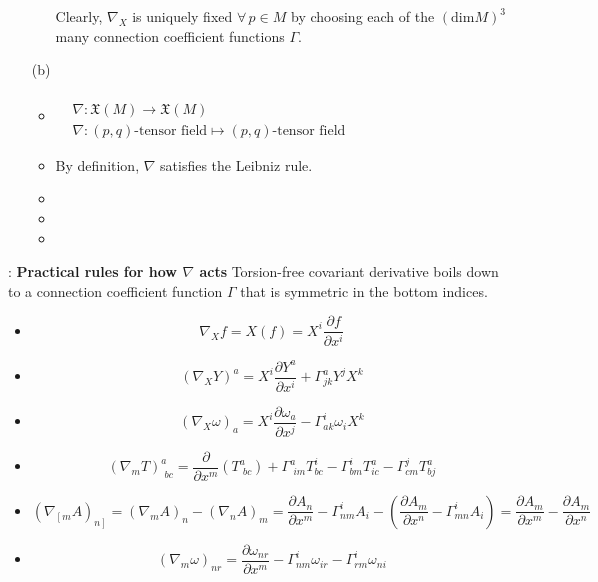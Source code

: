 \documentclass[10pt]{amsart}
\newcommand{\exercisehead}[1]
  { \smallskip
   \noindent{\small\bf Exercise #1.}
  }
\begin{document}
\begin{multicols*}{2}
\begin{enumerate}
\begin{itemize}
\[			\]
			Clearly, $\nabla_X$ is uniquely fixed $\forall \, p \in M$ by choosing each of the $(\text{dim}M)^3$ many connection coefficient functions $\Gamma$. 
		\end{itemize}
		\item[(b)] 
		\begin{itemize}
			\item $\begin{aligned} & \quad \\ & \nabla: \mathfrak{X}(M) \to \mathfrak{X}(M) \\
			& \nabla : (p,q)\text{-tensor field} \mapsto (p,q)\text{-tensor field} \end{aligned}$
			\item By definition, $\nabla$ satisfies the Leibniz rule. 
			\item
			\item
			\item
		\end{itemize}
	\end{enumerate}
	
	\exercisehead{2}: \textbf{Practical rules for how $\nabla$ acts}
	Torsion-free covariant derivative boils down to a connection coefficient function $\Gamma$ that is symmetric in the bottom indices.
	
	\begin{itemize}
		\item \[
		\nabla_Xf = X(f) = X^i \frac{ \partial f}{ \partial x^i }
		\]
		\item \[
		(\nabla_X Y)^a = X^i \frac{ \partial Y^a}{ \partial x^i} + \Gamma^a_{jk} Y^j X^k 
		\]
		\item \[
		(\nabla_X \omega)_a = X^i \frac{ \partial \omega_a}{ \partial x^j}  - \Gamma^i_{ak} \omega_i X^k
		\]
		\item \[
		(\nabla_m T)^a_{ \, \, bc} = \frac{ \partial }{ \partial x^m} (T^a_{ \, \, bc} ) + \Gamma^a_{ \, \, im} T^i_{bc} - \Gamma^i_{bm} T^a_{ic} - \Gamma^j_{cm} T^a_{bj}
		\]
		\item \[
		(\nabla_{ \left[ m \right. } A)_{ \left. n \right] } = (\nabla_m A)_n - (\nabla_n A)_m = \frac{ \partial A_n}{ \partial x^m } - \Gamma^i_{ nm} A_i - \left( \frac{ \partial A_m}{ \partial x^n} - \Gamma^i_{mn} A_i \right) = \frac{ \partial A_m}{ \partial x^m} - \frac{ \partial A_m}{ \partial x^n }
		\]
		\item \[
		(\nabla_m \omega)_{nr} = \frac{ \partial \omega_{nr}}{ \partial x^m} - \Gamma^i_{nm } \omega_{ir} - \Gamma^i_{rm} \omega_{ni}
		\]
	\end{itemize}
	

\end{multicols*}
\end{document}

